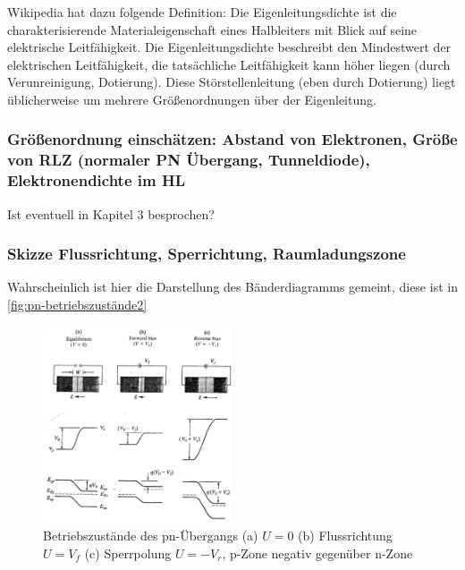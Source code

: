 	Wikipedia hat dazu folgende Definition: Die Eigenleitungsdichte ist die charakterisierende Materialeigenschaft eines Halbleiters mit Blick auf seine elektrische Leitfähigkeit.
	Die Eigenleitungsdichte beschreibt den Mindestwert der elektrischen Leitfähigkeit, die tatsächliche Leitfähigkeit kann höher liegen (durch Verunreinigung, Dotierung). Diese Störstellenleitung (eben durch Dotierung) liegt üblicherweise um mehrere Größenordnungen über der Eigenleitung. 
	
	\subsubsection{Größenordnung einschätzen: Abstand von Elektronen, Größe von RLZ (normaler PN Übergang, Tunneldiode), Elektronendichte im HL}
	Ist eventuell in Kapitel 3 besprochen?
	
	\subsubsection{Skizze Flussrichtung, Sperrichtung, Raumladungszone}
	
	Wahrscheinlich ist hier die Darstellung des Bänderdiagramms gemeint, diese ist in \autoref{fig:pn-betriebszustände2}
	
       \begin{figure}[H]
        \centering
        \includegraphics[width=0.5\textwidth]{fig/pn-fluss-sperr-rlz.jpg}
        \caption{Betriebszustände des pn-Übergangs (a) $U = 0$ (b) Flussrichtung $U = V_f$ (c) Sperrpolung $U = -V_r$, p-Zone negativ gegenüber n-Zone}
        \label{fig:pn-betriebszustände2}
    \end{figure}
	

